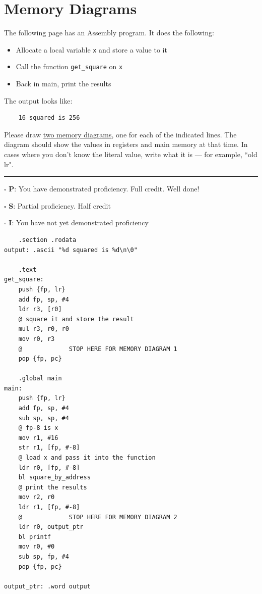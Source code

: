 \documentclass[12pt]{article}
\begin{document}
\section*{Memory Diagrams}

The following page has an Assembly program. It does the following:
\begin{itemize}
    \item Allocate a local variable \texttt{x} and store a value to it
    \item Call the function \texttt{get\_square} on \texttt{x}
    \item Back in main, print the results
\end{itemize}

The output looks like:
\begin{verbatim}
    16 squared is 256
\end{verbatim}

Please draw \underline{two memory diagrams}, one for each of the indicated lines. The diagram should show the values in registers and main memory at that time. In cases where you don't know the literal value, write what it is --- for example, ``old lr". 


\vfill

\rule[1ex]{\textwidth}{.1pt}

$\square$ \textbf{P}: You have demonstrated proficiency. Full credit. Well done!

$\square$ \textbf{S}: Partial proficiency. Half credit

$\square$ \textbf{I}: You have not yet demonstrated proficiency

\newpage

\begin{verbatim}
    .section .rodata
output: .ascii "%d squared is %d\n\0"

    .text
get_square:
    push {fp, lr}
    add fp, sp, #4
    ldr r3, [r0]
    @ square it and store the result
    mul r3, r0, r0
    mov r0, r3
    @             STOP HERE FOR MEMORY DIAGRAM 1
    pop {fp, pc}

    .global main
main: 
    push {fp, lr}
    add fp, sp, #4
    sub sp, sp, #4
    @ fp-8 is x
    mov r1, #16
    str r1, [fp, #-8]
    @ load x and pass it into the function
    ldr r0, [fp, #-8]
    bl square_by_address
    @ print the results
    mov r2, r0
    ldr r1, [fp, #-8]
    @             STOP HERE FOR MEMORY DIAGRAM 2
    ldr r0, output_ptr
    bl printf
    mov r0, #0
    sub sp, fp, #4
    pop {fp, pc}

output_ptr: .word output
\end{verbatim}
\end{document}
